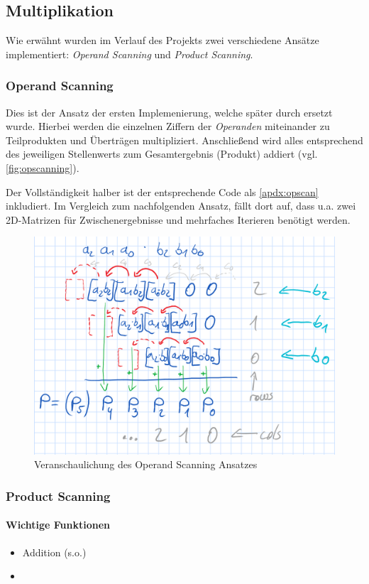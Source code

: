\subsection{Multiplikation}
    Wie erwähnt wurden im Verlauf des Projekts zwei verschiedene Ansätze implementiert: \emph{Operand Scanning} und \emph{Product Scanning}.

    \subsubsection{Operand Scanning} \label{sec:opscanning}
    Dies ist der Ansatz der ersten Implemenierung, welche später durch  ersetzt wurde.
    Hierbei werden die einzelnen Ziffern der \emph{Operanden} miteinander zu Teilprodukten und Überträgen multipliziert. Anschließend wird alles entsprechend des jeweiligen Stellenwerts zum Gesamtergebnis (Produkt) addiert (vgl. \autoref{fig:opscanning}).

    Der Vollständigkeit halber ist der entsprechende Code als \autoref{apdx:opscan} inkludiert.
    Im Vergleich zum nachfolgenden Ansatz, fällt dort auf, dass u.a. zwei 2D-Matrizen für Zwischenergebnisse und mehrfaches Iterieren benötigt werden.

    \begin{figure}[H]
        \centering
        \includegraphics[width=0.7\linewidth]{images/opscanning}
        \caption{Veranschaulichung des Operand Scanning Ansatzes}
        \label{fig:opscanning}
    \end{figure}

\subsubsection{Product Scanning} \label{sec:prodscan}

    \paragraph*{Wichtige Funktionen}
    \begin{itemize} \tightlist
        \item Addition (s.o.)
        \item {}
    \end{itemize}

